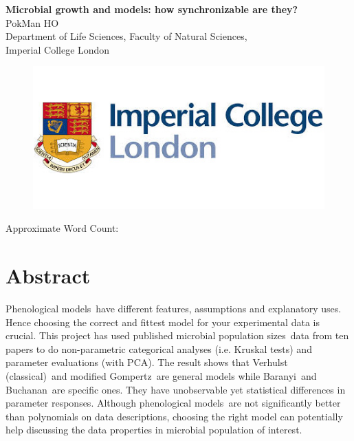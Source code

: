 \documentclass[a4paper, 11pt]{article}
\title{\ReportTitle}
\author{\ReportAuthor\ (CID: 01786076)}
\date{}
\newcommand{\pms}{phenological models}
\newcommand{\Pms}{Phenological models}
\newcommand{\ReportTitle}{Microbial growth and models: how synchronizable are they?} %
\newcommand{\ReportAuthor}{PokMan HO}
\newcommand{\ReportAffil}{Department of Life Sciences, Faculty of Natural Sciences,\\Imperial College London}
\newcommand{\fve}{Verhulst (classical)}
\newcommand{\fgo}{modified Gompertz}
\newcommand{\fba}{Baranyi}
\newcommand{\fbu}{Buchanan}
\newcommand{\pps}{population sizes}
\begin{document}
	\begin{center}
		\Huge\textbf{\ReportTitle}\\
		\LARGE\ReportAuthor\\
		\Large\ReportAffil
	\end{center}
	\begin{figure}[h]
		\centering\includegraphics[width=\linewidth]{icl.jpg}
	\end{figure}
	\begin{flushright}
		\Large Approximate Word Count: %
	\end{flushright}
	\clearpage
	
	\maketitle
	\section*{Abstract}
	\Pms\ have different features, assumptions and explanatory uses.  Hence choosing the correct and fittest model for your experimental data is crucial.  This project has used published microbial \pps\ data from ten papers to do non-parametric categorical analyses (i.e. Kruskal tests) and parameter evaluations (with PCA).  The result shows that \fve\ and \fgo\ are general models while \fba\ and \fbu\ are specific ones.  They have unobservable yet statistical differences in parameter responses.  Although \pms\ are not significantly better than polynomials on data descriptions, choosing the right model can potentially help discussing the data properties in microbial population of interest.
	
\end{document}
